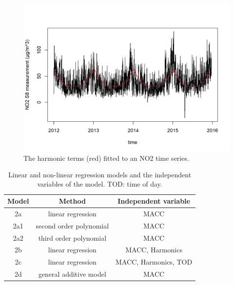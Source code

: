 \documentclass{article}
\begin{document}
\begin{figure}[tbp]
  \center
\includegraphics[scale = 0.6]{fit.png}
\caption{The harmonic terms (red) fitted to an NO2 time series. }
\label{fig:fit}
\end{figure}
 
 
\begin{table}[tbp]
\centering
\begin{tabular}{ c c c }
  \toprule
Model & Method & Independent variable\\ \midrule

2a &linear regression &MACC   \\
2a1 & second order polynomial & MACC \\  
2a2 & third order polynomial & MACC   \\ 

2b &linear regression & MACC, Harmonics   \\
2c &linear regression & MACC, Harmonics, TOD  \\
2d & general additive model & MACC  \\  \bottomrule
\end{tabular}
\caption{ Linear and non-linear regression models and the independent variables of the model. TOD: time of day. } 
\label{table:1}
\end{table}
\end{document}
